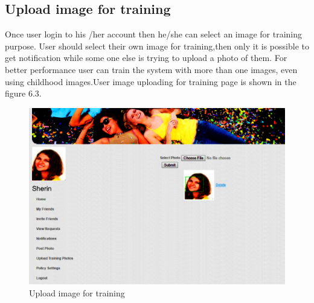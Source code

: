  \subsection[Upload Image for Training]{Upload image for training}
Once user login to his /her account then  he/she  can  select an image for training purpose. User should select their own image for training,then only it is possible to get notification while some one else is trying  to upload a photo of them. For better performance user can train the system with more than one images, even using childhood images.User image uploading for training  page is shown in  the figure 6.3.
\vspace{1cm} 
\vspace{1cm}
\vspace{1cm}
\begin{figure}[H]
\begin{minipage}[c]{1\linewidth}
\begin{center}
 \includegraphics[width=\textwidth]{training2.png}
      \caption[Upload Image for Training Page]{Upload image for training}
        \label{Upload image for training}
\end{center}

  \end{minipage}  
   
      \end{figure}
      
\clearpage
